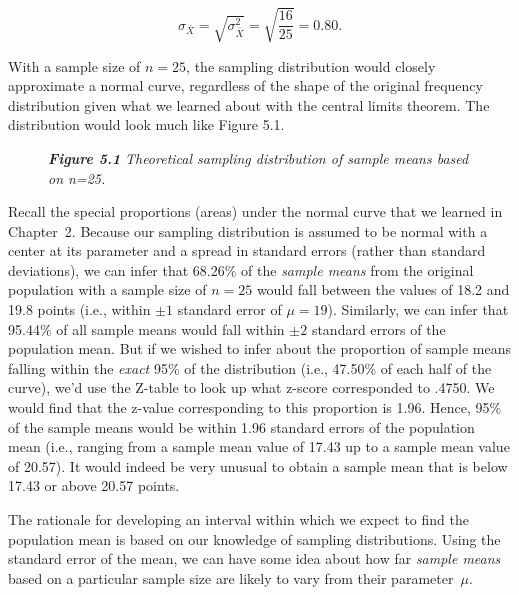 \documentclass[12pt]{article}
\begin{document}
\[
\sigma_{\bar{X}} = \sqrt{\sigma_{\bar{X}}^2} = \sqrt{\frac{16}{25}} = 0.80.
\]

With a sample size of $n=25$, the sampling distribution would closely approximate a normal curve, regardless of the shape of the original frequency distribution given what we learned about with the central limits theorem. The distribution would look much like Figure 5.1.

\begin{figure}[h]
\centering
{}
\caption*{\textbf{\emph{Figure 5.1}} \emph{Theoretical sampling distribution of sample means based on n=25.}}
\end{figure}

\newpage


Recall the special proportions (areas) under the normal curve that we learned in Chapter~2. Because our sampling distribution is assumed to be normal with a center at its parameter and a spread in standard errors (rather than standard deviations), we can infer that 68.26\% of the \textit{sample means} from the original population with a sample size of $n=25$ would fall between the values of 18.2 and 19.8 points (i.e., within $\pm 1$ standard error of $\mu=19$). Similarly, we can infer that 95.44\% of all sample means would fall within $\pm 2$ standard errors of the population mean. But if we wished to infer about the proportion of sample means falling within the \textit{exact} 95\% of the distribution (i.e., 47.50\% of each half of the curve), we'd use the Z-table to look up what z-score corresponded to .4750. We would find that the z-value corresponding to this proportion is 1.96. Hence, 95\% of the sample means would be within 1.96 standard errors of the population mean (i.e., ranging from a sample mean value of 17.43 up to a sample mean value of 20.57). It would indeed be very unusual to obtain a sample mean that is below 17.43 or above 20.57 points.

The rationale for developing an interval within which we expect to find the population mean is based on our knowledge of sampling distributions. Using the standard error of the mean, we can have some idea about how far \textit{sample means} based on a particular sample size are likely to vary from their parameter~$\mu$.
\end{document}
